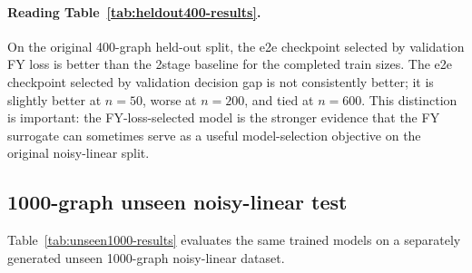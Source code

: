 \documentclass[11pt]{article}
\begin{document}
\paragraph{Reading Table~\ref{tab:heldout400-results}.}
On the original 400-graph held-out split, the e2e checkpoint selected by
validation FY loss is better than the 2stage baseline for the completed
train sizes. The e2e checkpoint selected by validation decision gap is not
consistently better; it is slightly better at \(n=50\), worse at \(n=200\), and
tied at \(n=600\). This distinction is important: the FY-loss-selected model is
the stronger evidence that the FY surrogate can sometimes serve as a useful
model-selection objective on the original noisy-linear split.

\subsection{1000-graph unseen noisy-linear test}

Table~\ref{tab:unseen1000-results} evaluates the same trained models on a
separately generated unseen 1000-graph noisy-linear dataset.

\begin{table}[h]
\centering
\caption{1000-graph unseen noisy-linear test results.}
\label{tab:unseen1000-results}
\end{table}
\end{document}
